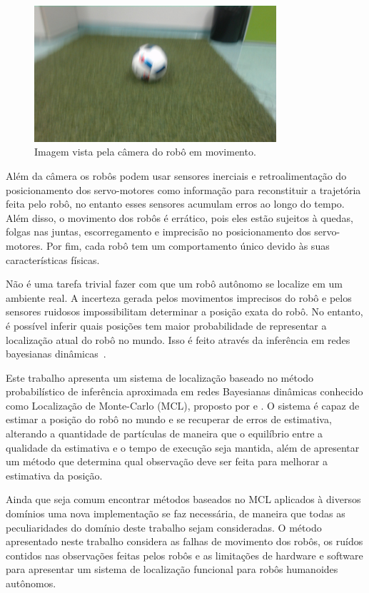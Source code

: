 \documentclass[
  12pt,       %
  oneside,
  a4paper,      %
  english,      %
  french,       %
  spanish,      %
  brazil,       %
  ]{abntex2}
\begin{document}
\begin{figure}[t]
  \centering
  \caption{Imagem vista pela câmera do robô em movimento.}\label{fig:visioncamera}
    \includegraphics[width=0.8\textwidth, height=0.45\textwidth]{fig/foto}
\end{figure}

Além da câmera os robôs podem usar sensores inerciais e retroalimentação do posicionamento dos servo-motores como informação para reconstituir a trajetória feita pelo robô, no entanto esses sensores acumulam erros ao longo do tempo.
Além disso, o movimento dos robôs é errático, pois eles estão sujeitos à quedas, folgas nas juntas, escorregamento e imprecisão no posicionamento dos servo-motores.
Por fim, cada robô tem um comportamento único devido às suas características físicas.

Não é uma tarefa trivial fazer com que um robô autônomo se localize em um ambiente real.
A incerteza gerada pelos movimentos imprecisos do robô e pelos sensores ruidosos impossibilitam determinar a posição exata do robô.
No entanto, é possível inferir quais posições tem maior probabilidade de representar a localização atual do robô no mundo.
Isso é feito através da inferência em redes bayesianas dinâmicas~\cite{russell2010artificial}.

Este trabalho apresenta um sistema de localização baseado no método probabilístico de inferência aproximada em redes Bayesianas dinâmicas conhecido como Localização de Monte-Carlo (MCL), proposto por  e .
O sistema é capaz de estimar a posição do robô no mundo e se recuperar de erros de estimativa, alterando a quantidade de partículas de maneira que o equilíbrio entre a qualidade da estimativa e o tempo de execução seja mantida, além de apresentar um método que determina qual observação deve ser feita para melhorar a estimativa da posição.

Ainda que seja comum encontrar métodos baseados no MCL aplicados à diversos domínios uma nova implementação se faz necessária, de maneira que todas as peculiaridades do domínio deste trabalho sejam consideradas.
O método apresentado neste trabalho considera as falhas de movimento dos robôs, os ruídos contidos nas observações feitas pelos robôs e as limitações de hardware e software para apresentar um sistema de localização funcional para robôs humanoides autônomos.
\end{document}

